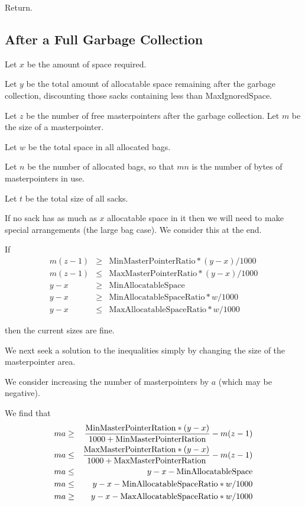 \documentclass[12pt]{article}
\begin{document}
Return.

\subsection{After a Full Garbage Collection}

Let $x$ be the amount of space required. 

Let $y$ be the total amount of allocatable space remaining after the
garbage collection, discounting those sacks containing less than
MaxIgnoredSpace.

Let $z$ be the number of free masterpointers after the garbage
collection. Let $m$ be the size of a masterpointer.

Let $w$ be the total space in all allocated bags.

Let $n$ be the number of allocated bags, so that $mn$ is the number of 
bytes of masterpointers in use.

Let $t$ be the total size of all sacks.


If no sack has as much as $x$ allocatable space in it then we will 
need to make special arrangements (the large bag case). We consider
this at the end.


If \begin{eqnarray}
m(z-1) &\ge& \mbox{MinMasterPointerRatio} * (y-x) / 1000\label{minmp}\\
m(z-1) &\le& \mbox{MaxMasterPointerRatio} * (y-x) / 1000\label{maxmp}\\
y -x&\ge& \mbox{MinAllocatableSpace}\label{minspace}\\
y -x&\ge& \mbox{MinAllocatableSpaceRatio}*w/1000\label{minspacer}\\
y -x&\le& \mbox{MaxAllocatableSpaceRatio}*w/1000\label{maxspacer}
\end{eqnarray}

then the current sizes are fine.

We next seek a solution to the inequalities simply by changing the
size of the masterpointer area. 

We consider increasing the number of masterpointers by $a$ (which may
be negative). 

We find that
\begin{eqnarray}
ma &\ge& {\mbox{MinMasterPointerRation} * (y-x) \over 1000 +
\mbox{MinMasterPointerRation}} - m(z-1) \\
ma &\le& {\mbox{MaxMasterPointerRation} * (y-x) \over 1000 +
\mbox{MaxMasterPointerRation}} - m(z-1) \\
ma & \le & y - x - \mbox{MinAllocatableSpace}\\
ma & \le & y - x - \mbox{MinAllocatableSpaceRatio} * w /1000\\
ma & \ge & y - x - \mbox{MaxAllocatableSpaceRatio} * w /1000
\end{eqnarray}
\end{document}

